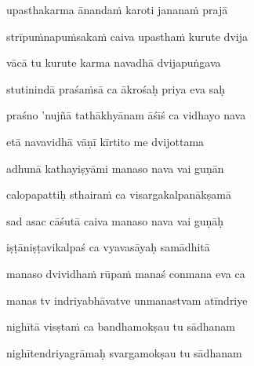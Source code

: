 upasthakarma ānandaṁ karoti jananaṁ prajā\thinspace{\dandab} \dontdisplaylinenum

strīpuṁnapuṁsakaṁ caiva upasthaṁ kurute dvija \veg\dontdisplaylinenum



vācā tu kurute karma navadhā dvijapuṅgava\thinspace{\dandab} \dontdisplaylinenum

stutinindā praśaṁsā ca ākrośaḥ priya eva saḥ \veg\dontdisplaylinenum
{}

praśno 'nujñā tathākhyānam āśīś ca vidhayo nava\thinspace{\dandab} \dontdisplaylinenum

etā navavidhā vāṇī kīrtito me dvijottama \veg\dontdisplaylinenum



adhunā kathayiṣyāmi manaso nava vai guṇān\thinspace{\dandab} \dontdisplaylinenum

calopapattiḥ sthairaṁ ca visargakalpanākṣamā \danda\dontdisplaylinenum

sad asac cāśutā caiva manaso nava vai guṇāḥ \veg\dontdisplaylinenum

iṣṭāniṣṭavikalpaś ca vyavasāyaḥ samādhitā\thinspace{\dandab} \dontdisplaylinenum

manaso dvividhaṁ rūpaṁ manaś conmana eva ca \veg\dontdisplaylinenum
{}

manas tv indriyabhāvatve unmanastvam atīndriye\thinspace{\dandab} \dontdisplaylinenum

nighītā visṣtaṁ ca bandhamokṣau tu sādhanam \veg\dontdisplaylinenum
{}

nighītendriyagrāmaḥ svargamokṣau tu sādhanam\thinspace{\dandab} \dontdisplaylinenum

